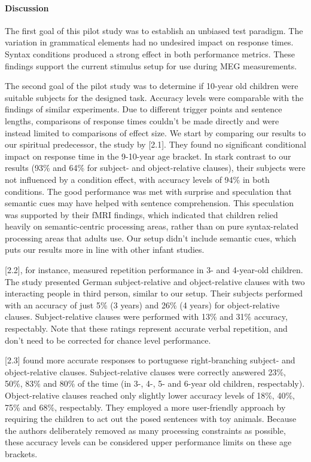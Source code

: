 \paragraph{Discussion}

The first goal of this pilot study was to establish an unbiased test paradigm.
The variation in grammatical elements had no undesired impact on response times.
Syntax conditions produced a strong effect in both performance metrics.
These findings support the current stimulus setup for use during MEG measurements.


The second goal of the pilot study was to determine if 10-year old children were suitable subjects for the designed task.
Accuracy levels were comparable with the findings of similar experiments.
Due to different trigger points and sentence lengths, comparisons of response times couldn't be made directly and were instead limited to comparisons of effect size.
We start by comparing our results to our spiritual predecessor, the study by [2.1].
They found no significant conditional impact on response time in the 9-10-year age bracket.
In stark contrast to our results (93\% and 64\% for subject- and object-relative clauses), their subjects were not influenced by a condition effect, with accuracy levels of 94\% in both conditions.
The good performance was met with surprise and speculation that semantic cues may have helped with sentence comprehension.
This speculation was supported by their fMRI findings, which indicated that children relied heavily on semantic-centric processing areas, rather than on pure syntax-related processing areas that adults use.
Our setup didn't include semantic cues, which puts our results more in line with other infant studies.

[2.2], for instance, measured repetition performance in 3- and 4-year-old children.
The study presented German subject-relative and object-relative clauses with two interacting people in third person, similar to our setup.
Their subjects performed with an accuracy of just 5\% (3 years) and 26\% (4 years) for object-relative clauses.
Subject-relative clauses were performed with 13\% and 31\% accuracy, respectably.
Note that these ratings represent accurate verbal repetition, and don't need to be corrected for chance level performance.

[2.3] found more accurate responses to portuguese right-branching subject- and object-relative clauses.
Subject-relative clauses were correctly answered 23\%, 50\%, 83\% and 80\% of the time (in 3-, 4-, 5- and 6-year old children, respectably).
Object-relative clauses reached only slightly lower accuracy levels of 18\%, 40\%, 75\% and 68\%, respectably.
They employed a more user-friendly approach by requiring the children to act out the posed sentences with toy animals.
Because the authors deliberately removed as many processing constraints as possible, these accuracy levels can be considered upper performance limits on these age brackets.

